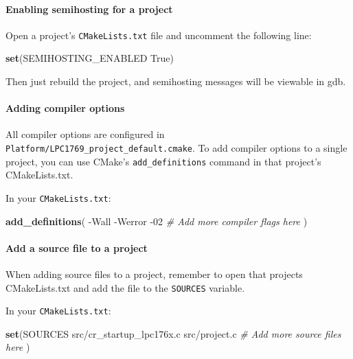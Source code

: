 \documentclass[]{article}
\newenvironment{Shaded}{\begin{snugshade}}{\end{snugshade}}
\newcommand{\KeywordTok}[1]{\textcolor[rgb]{0.13,0.29,0.53}{\textbf{{#1}}}}
\newcommand{\CommentTok}[1]{\textcolor[rgb]{0.56,0.35,0.01}{\textit{{#1}}}}
\newcommand{\OtherTok}[1]{\textcolor[rgb]{0.56,0.35,0.01}{{#1}}}
\newcommand{\NormalTok}[1]{{#1}}
\begin{document}
\paragraph{Enabling semihosting for a project}

Open a project's \texttt{CMakeLists.txt} file and uncomment the
following line:

\begin{Shaded}
\begin{Highlighting}[]
    \KeywordTok{set}\NormalTok{(SEMIHOSTING_ENABLED True)}
\end{Highlighting}
\end{Shaded}

Then just rebuild the project, and semihosting messages will be viewable
in gdb.

\paragraph{Adding compiler options}

All compiler options are configured in
\texttt{Platform/LPC1769\_project\_default.cmake}. To add compiler
options to a single project, you can use CMake's
\texttt{add\_definitions} command in that project's CMakeLists.txt.

In your \texttt{CMakeLists.txt}:

\begin{Shaded}
\begin{Highlighting}[]
    \KeywordTok{add_definitions}\NormalTok{(}
      \NormalTok{-Wall}
      \NormalTok{-Werror}
      \NormalTok{-02}
      \CommentTok{# Add more compiler flags here}
    \NormalTok{)}
\end{Highlighting}
\end{Shaded}

\paragraph{Add a source file to a project}

When adding source files to a project, remember to open that projects
CMakeLists.txt and add the file to the \texttt{SOURCES} variable.

In your \texttt{CMakeLists.txt}:

\begin{Shaded}
\begin{Highlighting}[]
    \KeywordTok{set}\NormalTok{(}\OtherTok{SOURCES}
      \NormalTok{src/cr_startup_lpc176x.c}
      \NormalTok{src/project.c}
      \CommentTok{# Add more source files here}
    \NormalTok{)}
\end{Highlighting}
\end{Shaded}
\end{document}
